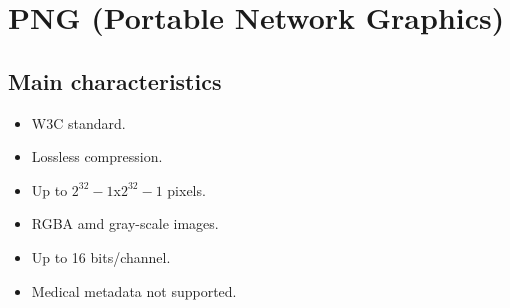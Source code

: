 \chapter{PNG (Portable Network Graphics)}

\section{Main characteristics}
\begin{itemize}
\item W3C standard.
\item Lossless compression.
\item Up to $2^32-1$x$2^32-1$ pixels.
\item RGBA amd gray-scale images.
\item Up to 16 bits/channel.
\item Medical metadata not supported.
\end{itemize}